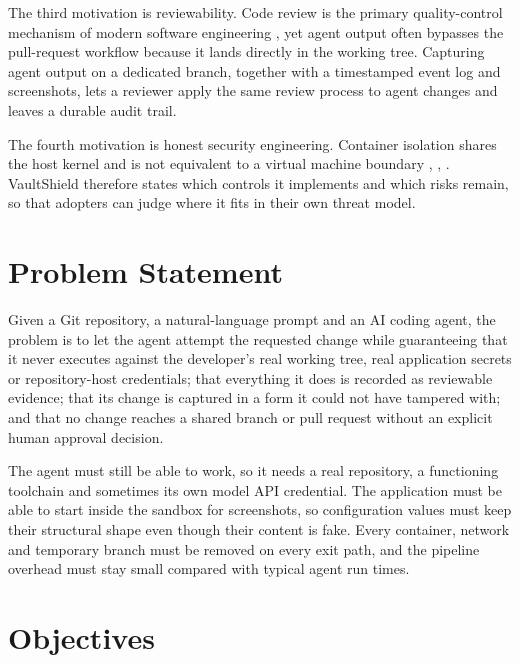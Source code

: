 \documentclass[12pt,a4paper,oneside]{report}
\begin{document}
The third motivation is reviewability. Code review is the primary quality-control mechanism of modern software engineering \cite{ref14}, yet agent output often bypasses the pull-request workflow because it lands directly in the working tree. Capturing agent output on a dedicated branch, together with a timestamped event log and screenshots, lets a reviewer apply the same review process to agent changes and leaves a durable audit trail.

The fourth motivation is honest security engineering. Container isolation shares the host kernel and is not equivalent to a virtual machine boundary \cite{ref11}, \cite{ref12}, \cite{ref13}. VaultShield therefore states which controls it implements and which risks remain, so that adopters can judge where it fits in their own threat model.

\section{Problem Statement}\label{problem-statement}

Given a Git repository, a natural-language prompt and an AI coding agent, the problem is to let the agent attempt the requested change while guaranteeing that it never executes against the developer's real working tree, real application secrets or repository-host credentials; that everything it does is recorded as reviewable evidence; that its change is captured in a form it could not have tampered with; and that no change reaches a shared branch or pull request without an explicit human approval decision.

The agent must still be able to work, so it needs a real repository, a functioning toolchain and sometimes its own model API credential. The application must be able to start inside the sandbox for screenshots, so configuration values must keep their structural shape even though their content is fake. Every container, network and temporary branch must be removed on every exit path, and the pipeline overhead must stay small compared with typical agent run times.

\section{Objectives}\label{objectives}
\end{document}
